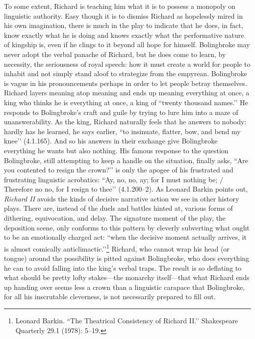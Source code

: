 To some extent, Richard is teaching him what it is to possess a monopoly on linguistic authority.
Easy though it is to dismiss Richard as hopelessly mired in his own imagination, there is much in the play to indicate that he does, in fact, know exactly what he is doing and knows exactly what the performative nature of kingship is, even if he clings to it beyond all hope for himself.
Bolingbroke may never adopt the verbal panache of Richard, but he does come to learn, by necessity, the seriousness of royal speech: how it must create a world for people to inhabit and not simply stand aloof to strategize from the empyrean.
Bolingbroke is vague in his pronouncements perhaps in order to let people betray themselves.
Richard layers meaning atop meaning and ends up meaning everything at once, a king who thinks he is everything at once, a king of ``twenty thousand names.’’ He responds to Bolingbroke’s craft and guile by trying to lure him into a maze of unanswerability.
As the king, Richard naturally feels that he answers to nobody: hardly has he learned, he says earlier, ``to insinuate, flatter, bow, and bend my knee’’ (4.1.165).
And so his answers in their exchange give Bolingbroke everything he wants but also nothing.
His famous response to the question Bolingbroke, still attempting to keep a handle on the situation, finally asks, ``Are you contented to resign the crown?’’ is only the apogee of his frustrated and frustrating linguistic acrobatics: ``Ay, no, no, ay; for I must nothing be; / Therefore no no, for I resign to thee’’ (4.1.200--2).
As Leonard Barkin points out, \emph{Richard II} avoids the kinds of decisive narrative action we see in other history plays.
There are, instead of the duels and battles hinted at, various forms of dithering, equivocation, and delay.
The signature moment of the play, the deposition scene, only conforms to this pattern by cleverly subverting what ought to be an emotionally charged act: ``when the decisive moment actually arrives, it is almost comically anticlimactic.’’\footnote{Leonard Barkin. ``The Theatrical Consistency of Richard II.’’ Shakespeare Quarterly 29.1 (1978): 5--19.} Richard, who cannot wrap his head (or tongue) around the possibility is pitted against Bolingbroke, who does everything he can to avoid falling into the king’s verbal traps.
The result is so deflating to what should be pretty lofty stakes---the monarchy itself---that what Richard ends up handing over seems less a crown than a linguistic carapace that Bolingbroke, for all his inscrutable cleverness, is not necessarily prepared to fill out.

